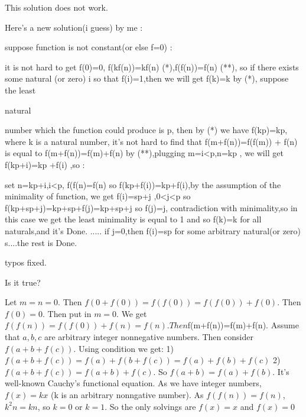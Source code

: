 \begin{solution}
	This solution does not work.
\end{solution}



\begin{solution}
	Here's a new solution(i guess) by me :

suppose function is not constant(or else f=0) :

it is not hard to get f(0)=0, f(kf(n))=kf(n) (*),f(f(n))=f(n) (**), so if there exists some natural (or zero) i so that f(i)=1,then we will get
f(k)=k by (*), suppose the least \begin{bolded}natural \end{bolded}number which the function could produce is p, then by (*) we have f(kp)=kp, where k is a natural number, it's not hard to find that f(m+f(n))=f(f(m)) + f(n) is equal to f(m+f(n))=f(m)+f(n) by (**),plugging m=i<p,n=kp , we will get f(kp+i)=kp +f(i) ,so :

set n=kp+i,i<p,
f(f(n)=f(n) so f(kp+f(i))=kp+f(i),by the assumption of the minimality of function, we get f(i)=sp+j ,0<j<p
so f(kp+sp+j)=kp+sp+f(j)=kp+sp+j
so f(j)=j, contradiction with minimality,so in this case we get the least minimality is equal to 1 and so f(k)=k for all naturals,and it's Done.
.....
if j=0,then f(i)=sp for some arbitrary natural(or zero) s....the rest is Done.

\begin{italicized}typos fixed.\end{italicized}
\end{solution}



\begin{solution}
	Is it true?

Let $m=n=0$. Then $f(0+f(0))=f(f(0))=f(f(0))+f(0)$. Then $f(0)=0$. Then put in $m=0$. We get $f(f(n))=f(f(0))+f(n)=f(n). Then $f(m+f(n))=f(m)+f(n). Assume that $a, b, c$ are arbitrary integer nonnegative numbers. Then consider $f(a+b+f(c))$. Using condition we get:
1) $f(a+b+f(c))=f(a)+f(b+f(c))=f(a)+f(b)+f(c)$
2) $f(a+b+f(c))=f(a+b)+f(c)$.
So $f(a+b)=f(a)+f(b)$. It's well-known Cauchy's functional equation. As we have integer numbers, $f(x)=kx$ (k is an arbitrary nonngative number). 
As $f(f(n))=f(n)$, $k^2n=kn$, so $k=0$ or $k=1$. So the only solvings are $f(x)=x$ and $f(x)=0$
\end{solution}



